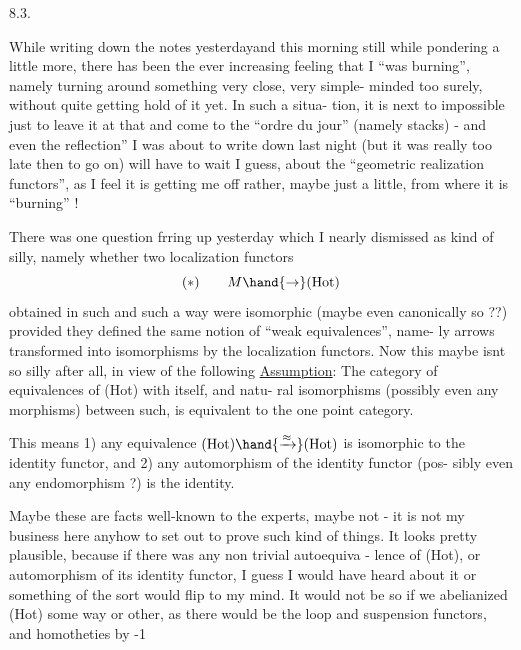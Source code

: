 
8.3.

 While writing down the notes yesterday\hand{,}and this morning still while
pondering a little more, there has been the ever increasing feeling that
I ``was burning'', namely turning around something very close, very simple-%
minded too surely, without quite getting hold of it yet. In such a situa-%
tion, it is next to impossible just to leave it at that and come to the
``ordre du jour'' (namely stacks) - and even the  reflection'' I was about
to write down last night (but it was really too late then to go on) will
have to wait I guess, about the ``geometric realization functors'', as I
feel it is getting me off rather, maybe just a little, from where it is
``burning'' !

There was one question frring up yesterday  which I nearly
dismissed as kind of silly, namely whether two localization functors
\[ (*) \qquad M \hand{\to} (\mathrm{Hot}) \]
obtained in such and such a way were isomorphic (maybe even canonically
so ??) provided they defined the same notion of ``weak equivalences'', name-%
ly arrows transformed into isomorphisms by the localization functors. Now
this maybe isnt so silly after all, in view of the following
\uline{Assumption}: The category of equivalences of (Hot) with itself, and  natu-%
ral isomorphisms (possibly even any morphisms) between such, is equivalent
to the one point category.

This means 1) any equivalence $(\mathrm{Hot})\hand{\xrightarrow{\approx}}(\mathrm{Hot})$ is isomorphic to the
identity functor, and 2) any automorphism of the identity functor (pos-%
sibly even any endomorphism ?) is the identity.

Maybe these are facts well-known to the experts, maybe not - it is
not my business here anyhow to set out to prove such kind of things. It
looks pretty plausible, because if there was any non trivial autoequiva -
lence of (Hot), or automorphism of its identity functor, I guess I would
have heard about it\hand{,} or something of the sort would flip to my mind. It
would not be so if we abelianized (Hot) some way or other, as there would
be the loop and suspension functors, and homotheties by -1  

